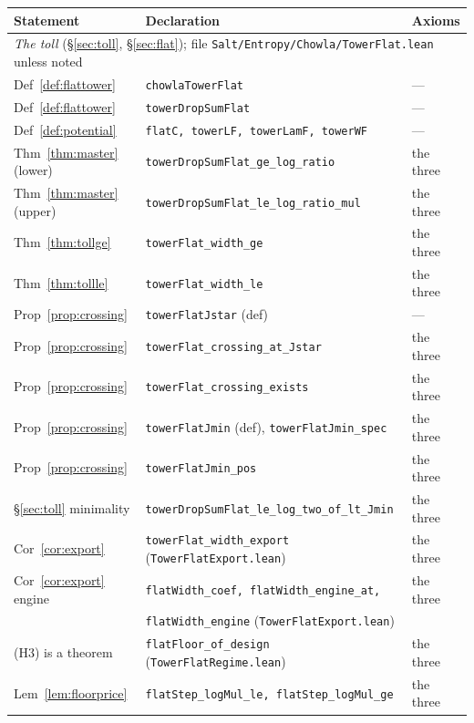 \documentclass[11pt]{amsart}
\newcommand{\leaninline}[1]{{\small\texttt{#1}}}
\theoremstyle{remark}
\begin{document}
\begin{table}[h]
\centering\small
\begin{tabular}{lll}
\toprule
Statement & Declaration & Axioms \\
\midrule
\multicolumn{3}{l}{\emph{The toll} (\S\ref{sec:toll}, \S\ref{sec:flat});
file \texttt{Salt/Entropy/Chowla/TowerFlat.lean} unless noted} \\
\midrule
Def~\ref{def:flattower} & \leaninline{chowlaTowerFlat} & --- \\
Def~\ref{def:flattower} & \leaninline{towerDropSumFlat} & --- \\
Def~\ref{def:potential} & \leaninline{flatC, towerLF, towerLamF, towerWF} & --- \\
Thm~\ref{thm:master} (lower) & \leaninline{towerDropSumFlat\_ge\_log\_ratio} & the three \\
Thm~\ref{thm:master} (upper) & \leaninline{towerDropSumFlat\_le\_log\_ratio\_mul} & the three \\
Thm~\ref{thm:tollge} & \leaninline{towerFlat\_width\_ge} & the three \\
Thm~\ref{thm:tollle} & \leaninline{towerFlat\_width\_le} & the three \\
Prop~\ref{prop:crossing} & \leaninline{towerFlatJstar} (def) & --- \\
Prop~\ref{prop:crossing} & \leaninline{towerFlat\_crossing\_at\_Jstar} & the three \\
Prop~\ref{prop:crossing} & \leaninline{towerFlat\_crossing\_exists} & the three \\
Prop~\ref{prop:crossing} & \leaninline{towerFlatJmin} (def), \leaninline{towerFlatJmin\_spec} & the three \\
Prop~\ref{prop:crossing} & \leaninline{towerFlatJmin\_pos} & the three \\
\S\ref{sec:toll} minimality & \leaninline{towerDropSumFlat\_le\_log\_two\_of\_lt\_Jmin} & the three \\
Cor~\ref{cor:export} & \leaninline{towerFlat\_width\_export}
  (\texttt{TowerFlatExport.lean}) & the three \\
Cor~\ref{cor:export} engine & \leaninline{flatWidth\_coef, flatWidth\_engine\_at,} & the three \\
 & \leaninline{flatWidth\_engine} (\texttt{TowerFlatExport.lean}) & \\
(H3) is a theorem & \leaninline{flatFloor\_of\_design}
  (\texttt{TowerFlatRegime.lean}) & the three \\
Lem~\ref{lem:floorprice} & \leaninline{flatStep\_logMul\_le, flatStep\_logMul\_ge} & the three \\

\end{tabular}
\end{table}
\end{document}

